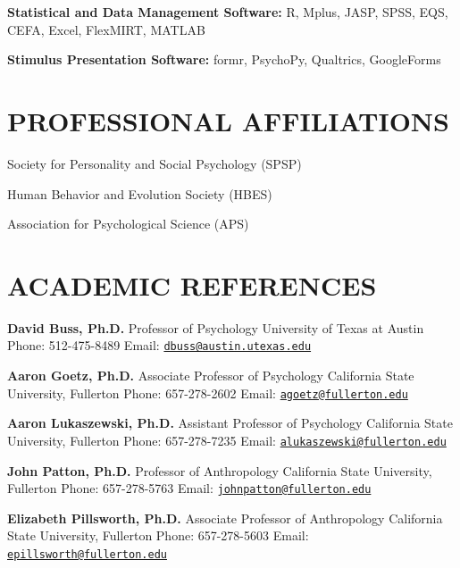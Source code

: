 \documentclass[10.5pt,]{article}
\begin{document}
\textbf{Statistical and Data Management Software:} R, Mplus, JASP, SPSS,
EQS, CEFA, Excel, FlexMIRT, MATLAB

\textbf{Stimulus Presentation Software:} formr, PsychoPy, Qualtrics,
GoogleForms

\hypertarget{professional-affiliations}{%
\section{PROFESSIONAL AFFILIATIONS}\label{professional-affiliations}}

Society for Personality and Social Psychology (SPSP)

Human Behavior and Evolution Society (HBES)

Association for Psychological Science (APS)

\newpage

\hypertarget{academic-references}{%
\section{ACADEMIC REFERENCES}\label{academic-references}}

\textbf{David Buss, Ph.D.} \newline Professor of Psychology \newline
University of Texas at Austin \newline Phone: 512-475-8489 \newline
Email:
\href{mailto:dbuss@austin.utexas.edu}{\nolinkurl{dbuss@austin.utexas.edu}}

\textbf{Aaron Goetz, Ph.D.} \newline Associate Professor of Psychology
\newline California State University, Fullerton \newline Phone:
657-278-2602 \newline Email:
\href{mailto:agoetz@fullerton.edu}{\nolinkurl{agoetz@fullerton.edu}}

\textbf{Aaron Lukaszewski, Ph.D.} \newline Assistant Professor of
Psychology \newline California State University, Fullerton \newline
Phone: 657-278-7235 \newline Email:
\href{mailto:alukaszewski@fullerton.edu}{\nolinkurl{alukaszewski@fullerton.edu}}

\textbf{John Patton, Ph.D.} \newline Professor of Anthropology \newline
California State University, Fullerton \newline Phone: 657-278-5763
\newline Email:
\href{mailto:johnpatton@fullerton.edu}{\nolinkurl{johnpatton@fullerton.edu}}

\textbf{Elizabeth Pillsworth, Ph.D.} \newline Associate Professor of
Anthropology \newline California State University, Fullerton \newline
Phone: 657-278-5603 \newline Email:
\href{mailto:epillsworth@fullerton.edu}{\nolinkurl{epillsworth@fullerton.edu}}
\end{document}
